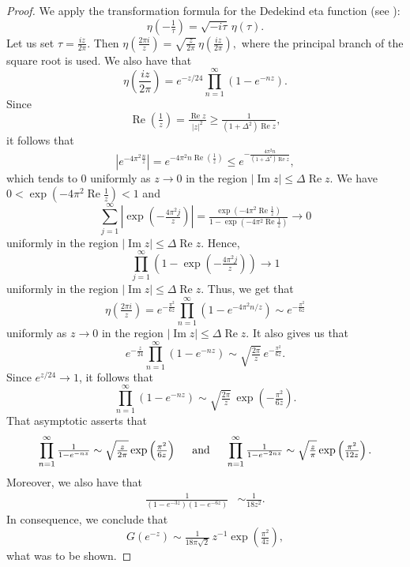 \documentclass[12pt,a4paper]{amsart}
\numberwithin{equation}{section}
\theoremstyle{plain}
\theoremstyle{definition}
\theoremstyle{remark}
\begin{document}
\begin{proof}
We apply the transformation formula for the Dedekind eta function (see \cite[Chapter~3]{ApostolModularFunctions}):
$$
\eta\left(-\tfrac1\tau\right)
=
\sqrt{-i\tau}\,\eta(\tau).
$$
Let us set $\tau=\frac{iz}{2\pi}.$
Then
$\eta\left(\frac{2\pi i}{z}\right)
=
\sqrt{\frac{z}{2\pi}}\,
\eta\left(\frac{iz}{2\pi}\right),
$
where the principal branch of the square root is used. We also have that
$$
\eta\left(\frac{iz}{2\pi}\right)
=
e^{-z/24}
\prod_{n=1}^\infty\left(1-e^{-nz}\right).
$$
Since
$$
\operatorname{Re}\!\left(\tfrac{1}{z}\right)
=
\tfrac{\operatorname{Re}z}{|z|^2}
\ge
\tfrac{1}{(1+\Delta^2)\operatorname{Re}z},
$$
it follows that
$$
\left|
e^{-4\pi^2\tfrac{n}{z}}
\right|
=
e^{-4\pi^2n\operatorname{Re}\left(\tfrac{1}{z}\right)}
\le
e^{-\frac{4\pi^2n}{(1+\Delta^2)\operatorname{Re}z}},
$$
which tends to $0$ uniformly as $z\to0$ in the region
$
|\operatorname{Im}z|
\le
\Delta\operatorname{Re}z.
$ We have
$
0<\exp\left(-4\pi^2\operatorname{Re}\tfrac1z\right)<1
$
and
$$
\sum_{j=1}^{\infty}
\left|
\exp\left(-\tfrac{4\pi^2j}{z}\right)
\right|
=
\tfrac{\exp\left(-4\pi^2\operatorname{Re}\tfrac1z\right)}{1-\exp\left(-4\pi^2\operatorname{Re}\tfrac1z\right)}
\longrightarrow0
$$
uniformly in the region $
|\operatorname{Im}z|
\le
\Delta\operatorname{Re}z.
$ Hence,
$$
\prod_{j=1}^{\infty}
\left(
1-\exp\left(-\tfrac{4\pi^2j}{z}\right)
\right)
\longrightarrow1
$$
uniformly in the region $
|\operatorname{Im}z|
\le
\Delta\operatorname{Re}z.
$
Thus, we get that
$$
\eta\left(\tfrac{2\pi i}{z}\right)
=
e^{-\tfrac{\pi^2}{6z}}
\prod_{n=1}^\infty\left(1-e^{-4\pi^2n/z}\right)
\sim
e^{-\tfrac{\pi^2}{6z}}
$$
uniformly as $z\to0$ in the region
$
|\operatorname{Im}z|
\le 
\Delta\operatorname{Re}z.
$
It also gives us that
$$
e^{-\tfrac{z}{24}}
\prod_{n=1}^\infty\left(1-e^{-nz}\right)
\sim
\sqrt{\tfrac{2\pi}{z}}\,
e^{-\tfrac{\pi^2}{6z}}.
$$
Since $e^{z/24}\to1$, it follows that
$$
\prod_{n=1}^\infty\left(1-e^{-nz}\right)
\sim
\sqrt{\tfrac{2\pi}{z}}\,
\exp\left(-\tfrac{\pi^2}{6z}\right).
$$
That asymptotic asserts that
\begin{align*}
    \prod_{n=1}^\infty\tfrac{1}{1-e^{-nz}}\sim\sqrt{\tfrac{z}{2\pi}}\exp\left(\tfrac{\pi^2}{6z}\right)\hspace{0.5cm}\text{and}\hspace{0.5cm}\prod_{n=1}^\infty\tfrac{1}{1-e^{-2nz}}\sim\sqrt{\tfrac{z}{\pi}}\exp\left(\tfrac{\pi^2}{12z}\right).
\end{align*}
Moreover, we also have that
\begin{align*}
    \tfrac{1}{(1-e^{-3z})(1-e^{-6z})}&\sim\tfrac{1}{18z^2}.
\end{align*}
In consequence, we conclude that
$$
G(e^{-z})
\sim
\tfrac{1}{18\pi\sqrt2}\,z^{-1}
\exp\left(\tfrac{\pi^2}{4z}\right),
$$
what was to be shown.
\end{proof}
\end{document}
